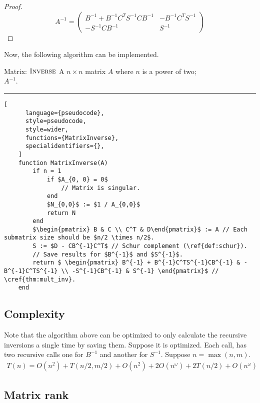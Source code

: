 \begin{proof}
    \[
        A^{-1} = 
        \begin{pmatrix}
            B^{-1} + B^{-1}C^TS^{-1}CB^{-1} & -B^{-1}C^TS^{-1} \\
            -S^{-1}CB^{-1} & S^{-1}
        \end{pmatrix}
    \]
\end{proof}

Now, the following algorithm can be implemented.
\begin{programruledcaption}{Matrix: \(\textsc{Inverse}\)}
    \noindent
     A \(n \times n\) matrix \(A\) where \(n\) is a power of two; \\
     \(A^{-1}\). 

    \noindent \hrule
    \begin{lstlisting}[
      language={pseudocode},
      style=pseudocode,
      style=wider,
      functions={MatrixInverse},
      specialidentifiers={},
    ]
    function MatrixInverse(A) 
        if n = 1  
            if $A_{0, 0} = 0$ 
                // Matrix is singular.
            end
            $N_{0,0}$ := $1 / A_{0,0}$
            return N
        end
        $\begin{pmatrix} B & C \\ C^T & D\end{pmatrix}$ := A // Each submatrix size should be $n/2 \times n/2$.
        S := $D - CB^{-1}C^T$ // Schur complement (\ref{def:schur}).
        // Save results for $B^{-1}$ and $S^{-1}$.
        return $ \begin{pmatrix} B^{-1} + B^{-1}C^TS^{-1}CB^{-1} & -B^{-1}C^TS^{-1} \\ -S^{-1}CB^{-1} & S^{-1} \end{pmatrix}$ // \cref{thm:mult_inv}.
    end
    \end{lstlisting}
\end{programruledcaption}

\subsection*{Complexity}
Note that the algorithm above can be optimized to only calculate the recursive inversions a single time by saving them.
Suppose it is optimized.
Each call, has two recursive calls one for \(B^{-1}\) and another for \(S^{-1}\).
Suppose \(n = \max(n, m)\).
\begin{align}
    T(n) = O(n^2) + T(n/2, m/2) + O(n^2) + 2O(n^\omega) + 2T(n/2) + O(n^\omega)
\end{align}

\subsection{Matrix rank}